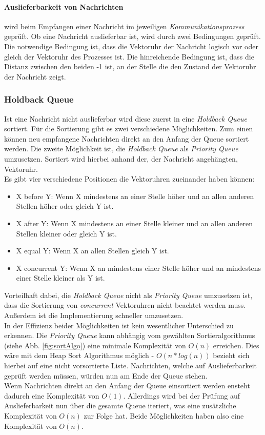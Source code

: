 \paragraph{Auslieferbarkeit von Nachrichten} wird beim Empfangen einer Nachricht im jeweiligen \textit{Kommunikationsprozess} geprüft. Ob eine Nachricht auslieferbar ist, wird durch zwei Bedingungen geprüft. Die notwendige Bedingung ist, dass die Vektoruhr der Nachricht logisch vor oder gleich der Vektoruhr des Prozesses ist. Die hinreichende Bedingung ist, dass die Distanz zwischen den beiden -1 ist, an der Stelle die den Zustand der Vektoruhr der Nachricht zeigt.

\subsubsection{Holdback Queue} \label{hbq_theory}

Ist eine Nachricht nicht auslieferbar wird diese zuerst in eine \textit{Holdback Queue} sortiert. Für die Sortierung gibt es zwei verschiedene Möglichkeiten. Zum einen können neu empfangene Nachrichten direkt an den Anfang der Queue sortiert werden. Die zweite Möglichkeit ist, die \textit{Holdback Queue} als \textit{Priority Queue} umzusetzen. Sortiert wird hierbei anhand der, der Nachricht angehängten, Vektoruhr.\\
Es gibt vier verschiedene Positionen die Vektoruhren zueinander haben können:
\begin{itemize} \label{positionVTs}
  \item X before Y: Wenn X mindestens an einer Stelle höher und an allen anderen Stellen höher oder gleich Y ist.
  \item X after Y: Wenn X mindestens an einer Stelle kleiner und an allen anderen Stellen kleiner oder gleich Y ist.
  \item X equal Y: Wenn X an allen Stellen gleich Y ist.
  \item X concurrent Y: Wenn X an mindestens einer Stelle höher und an mindestens einer Stelle kleiner als Y ist.
\end{itemize}

Vorteilhaft dabei, die \textit{Holdback Queue} nicht als \textit{Priority Queue} umzusetzen ist, dass die Sortierung von \textit{concurrent} Vektoruhren nicht beachtet werden muss. Außerdem ist die Implementierung schneller umzusetzen.\\
In der Effizienz beider Möglichkeiten ist kein wesentlicher Unterschied zu erkennen. Die \textit{Priority Queue} kann abhängig vom gewählten Sortieralgorithmus (siehe Abb. \ref{fig:sortAlgo}) eine minimale Komplexität von $O(n)$ erreichen. Dies wäre mit dem Heap Sort Algorithmus möglich - $O(n*log(n))$ bezieht sich hierbei auf eine nicht vorsortierte Liste. Nachrichten, welche auf Auslieferbarkeit geprüft werden müssen, würden nun am Ende der Queue stehen.\\
Wenn Nachrichten direkt an den Anfang der Queue einsortiert werden ensteht dadurch eine Komplexität von $O(1)$. Allerdings wird bei der Prüfung auf Auslieferbarkeit nun über die gesamte Queue iteriert, was eine zusätzliche Komplexität von $O(n)$ zur Folge hat. Beide Möglichkeiten haben also eine Komplexität von $O(n)$.

